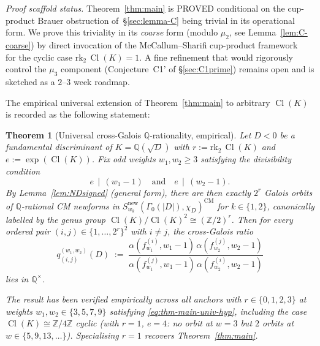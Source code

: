 \documentclass[11pt,a4paper]{amsart}
\theoremstyle{plain}
\newtheorem{theorem}{Theorem}[section]
\theoremstyle{definition}
\DeclareMathOperator{\Cl}{Cl}
\newcommand{\Q}{\mathbb{Q}}
\newcommand{\Z}{\mathbb{Z}}
\newcommand{\absD}{\lvert D\rvert}
\newcommand{\fl}[2]{f_{#1}^{(#2)}}
\newcommand{\qstr}[2]{q^{(#1,#2)}}
\begin{document}
\noindent\emph{Proof scaffold status.}  Theorem~\ref{thm:main} is
PROVED conditional on the cup-product Brauer obstruction
of~\S\ref{sec:lemma-C} being trivial in its operational form.  We
prove this triviality in its \emph{coarse} form (modulo $\mu_2$, see
Lemma~\ref{lem:C-coarse}) by direct invocation of the
McCallum--Sharifi cup-product framework~\cite{McCallumSharifi2002} for
the cyclic case $\mathrm{rk}_2\,\Cl(K) = 1$. A fine refinement that
would rigorously control the $\mu_3$ component (Conjecture~C1' of
\S\ref{sec:C1prime}) remains open and is sketched as a $2$--$3$ week
roadmap.

The empirical universal extension of Theorem~\ref{thm:main} to
arbitrary $\Cl(K)$ is recorded as the following statement:

\begin{theorem}[Universal cross-Galois $\Q$-rationality, empirical]\label{thm:main-universal}
Let $D < 0$ be a fundamental discriminant of $K = \Q(\sqrt{D})$ with
$r := \mathrm{rk}_2\,\Cl(K)$ and $e := \exp(\Cl(K))$. Fix odd weights
$w_1, w_2 \ge 3$ satisfying the divisibility condition
\begin{equation}\label{eq:thm-main-univ-hyp}
   e \,\mid\, (w_1 - 1) \quad\text{and}\quad e \,\mid\, (w_2 - 1).
\end{equation}
By Lemma~\ref{lem:NDsigned} (general form), there are then exactly
$2^r$ Galois orbits of $\Q$-rational CM newforms in
$S_{w_k}^{\mathrm{new}}(\Gamma_0(\absD), \chi_D)^{\mathrm{CM}}$ for
$k \in \{1, 2\}$, canonically labelled by the genus group
$\Cl(K)/\Cl(K)^2 \cong (\Z/2)^r$. Then for every ordered pair
$(i, j) \in \{1, \ldots, 2^r\}^2$ with $i \ne j$, the cross-Galois ratio
\begin{equation}\label{eq:thm-main-univ}
   \qstr{w_1}{w_2}_{(i,j)}(D) \;:=\;
   \frac{\alpha(\fl{w_1}{i}, w_1{-}1)\,\alpha(\fl{w_2}{j}, w_2{-}1)}
        {\alpha(\fl{w_1}{j}, w_1{-}1)\,\alpha(\fl{w_2}{i}, w_2{-}1)}
\end{equation}
lies in $\Q^\times$.

The result has been verified empirically across all anchors with
$r \in \{0, 1, 2, 3\}$ at weights $w_1, w_2 \in \{3, 5, 7, 9\}$ satisfying
\eqref{eq:thm-main-univ-hyp}, including the case
$\Cl(K) \cong \Z/4\Z$ cyclic (with $r = 1$, $e = 4$: no orbit at
$w = 3$ but $2$ orbits at $w \in \{5, 9, 13, \ldots\}$).
Specialising $r = 1$ recovers Theorem~\ref{thm:main}.
\end{theorem}
\end{document}
